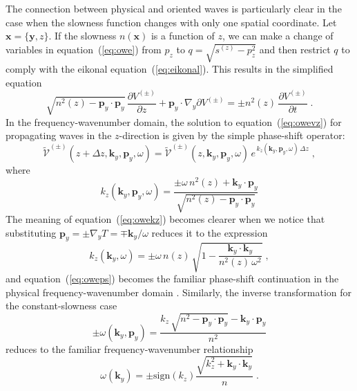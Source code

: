 The connection between physical and oriented waves is particularly clear in
the case when the slowness function changes with only one spatial coordinate.
Let $\mathbf{x}=\{\mathbf{y},z\}$. If the slowness $n(\mathbf{x})$ is a
function of $z$, we can make a change of variables in equation~(\ref{eq:owe})
from $p_z$ to $q = \sqrt{s^(z)-p_z^2}$ and then restrict $q$ to comply with
the eikonal equation~(\ref{eq:eikonal}). This results in the simplified
equation
\begin{equation}
  \label{eq:owevz}
\sqrt{n^2(z)- \mathbf{p}_y \cdot \mathbf{p}_y}\,
\frac{\partial V^{(\pm)}}{\partial z} +
\mathbf{p}_y \cdot \nabla_y \partial V^{(\pm)}
= \pm n^2(z)\,\frac{\partial V^{(\pm)}}{\partial t}\;.
\end{equation}
In the frequency-wavenumber domain, the solution to equation~(\ref{eq:owevz})
for propagating waves in the $z$-direction is given by the simple phase-shift
operator:
\begin{equation}
  \label{eq:oweps}
  \widetilde{\mathcal{V}}^{(\pm)}(z+\Delta z,\mathbf{k}_y,\mathbf{p}_y,\omega) =
  \widetilde{\mathcal{V}}^{(\pm)}(z,\mathbf{k}_y,\mathbf{p}_y,\omega)\,
  e^{\,k_z(\mathbf{k}_y,\mathbf{p}_y,\omega)\,\Delta z}\;,
\end{equation}
where 
\begin{equation}
  \label{eq:owekz}
  k_z(\mathbf{k}_y,\mathbf{p}_y,\omega) = 
  \frac{\pm \omega\,n^2(z) + \mathbf{k}_y \cdot \mathbf{p}_y}
  {\sqrt{n^2(z)-\mathbf{p}_y \cdot \mathbf{p}_y}}
\end{equation}
The meaning of equation~(\ref{eq:owekz}) becomes clearer when we notice that
substituting $\mathbf{p}_y= \pm \nabla_y T = \mp \mathbf{k}_y/\omega$ reduces
it to the expression
\begin{equation}
  \label{eq:wekz}
  k_z(\mathbf{k}_y,\omega) = \pm \omega\,n(z)\,
  \sqrt{1-\frac{\mathbf{k}_y \cdot \mathbf{k}_y}{n^2(z)\,\omega^2}}\;,
\end{equation}
and equation~(\ref{eq:oweps}) becomes the familiar phase-shift continuation in
the physical frequency-wavenumber domain \cite[]{GEO43-07-13421351}. Similarly,
the inverse transformation for the constant-slowness case
\begin{equation}
  \label{eq:owest}
  \pm \omega(\mathbf{k}_y,\mathbf{p}_y) = \frac{k_z\,\sqrt{n^2-\mathbf{p}_y
      \cdot \mathbf{p}_y} - \mathbf{k}_y \cdot \mathbf{p}_y}{n^2}
\end{equation}
reduces to the familiar frequency-wavenumber relationship
\cite[]{GEO43-01-00230048}
\begin{equation}
  \label{eq:west}
  \omega(\mathbf{k}_y) = \pm \mbox{sign}{(k_z)}\frac{\sqrt{k_z^2 + 
      \mathbf{k}_y \cdot \mathbf{k}_y}}{n}\;.
\end{equation}
